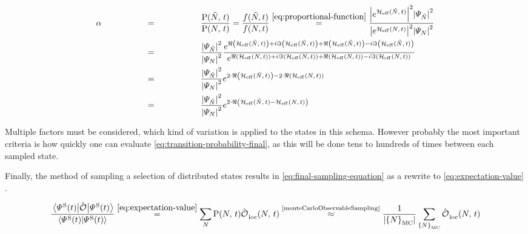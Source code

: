 \begin{equation}
    \label{eq:transition-probability-final}
    \begin{split}
        \alpha &\stackrel{\phantom{\ref{eq:proportional-function}}}{=} \frac{\probabilityOf{\tilde{N}}{t}}{\probabilityOf{N}{t}} =  \frac{f(\tilde{N},t)}{f(N,t)}
        \stackrel{\ref{eq:proportional-function}}{=}
        \frac{
            \absSquare{e^{\HeffOft[\tilde{N}]}} \absSquare{\psiN[\tilde{N}]}
        }{
            \absSquare{e^{\HeffOft}} \absSquare{\psiN}
        }\\
        &\stackrel{\phantom{\ref{eq:proportional-function}}}{=}
        \frac{\absSquare{\psiN[\tilde{N}]}}{\absSquare{\psiN}}
        \frac{
            e^{\real\left(\HeffOft[\tilde{N}]\right) + i\imaginary\left(\HeffOft[\tilde{N}]\right) +\real\left(\HeffOft[\tilde{N}]\right)-i \imaginary\left(\HeffOft[\tilde{N}]\right)}
        }{
            e^{\real\left(\HeffOft\right) + i\imaginary\left(\HeffOft\right) +\real\left(\HeffOft\right)-i \imaginary\left(\HeffOft\right)}
        }\\
        &\stackrel{\phantom{\ref{eq:proportional-function}}}{=}
        \frac{\absSquare{\psiN[\tilde{N}]}}{\absSquare{\psiN}}
        e^{2\cdot \real\left(\HeffOft[\tilde{N}]\right) - 2\cdot \real\left(\HeffOft\right)}\\
        &\stackrel{\phantom{\ref{eq:proportional-function}}}{=}
        \frac{\absSquare{\psiN[\tilde{N}]}}{\absSquare{\psiN}}
        e^{2\cdot \real\left(\HeffOft[\tilde{N}] - \HeffOft\right)}
    \end{split}
\end{equation}

Multiple factors must be considered, which kind of variation is applied to the states in this schema. 
However probably the most important criteria is how quickly one can evaluate \autoref{eq:transition-probability-final}, as this will be done tens to hundreds of times between each sampled state.

Finally, the method of sampling a selection of distributed states results in \autoref{eq:final-sampling-equation} as a rewrite to \autoref{eq:expectation-value} \cite{monteCarloObservableSampling}.

\begin{equation}
    \label{eq:final-sampling-equation}
    \frac{\bracketHelper{\psiOfT[\schroedingerPicture]}{\ObservableOp}{\psiOfT[\schroedingerPicture]}}{\braketHelper{\psiOfT[\schroedingerPicture]}{\psiOfT[\schroedingerPicture]}} \stackrel{\ref{eq:expectation-value}}{=} 
    \lsum[N]
    \probabilityOf{N}{t}
    \localObservable{N}{t} 
    \stackrel{\text{\cite{monteCarloObservableSampling}}}{\approx} \frac{1}{\left|\left\{N\right\}_\text{MC}\right|} \lsum[\left\{N\right\}_\text{MC}]\localObservable{N}{t}
\end{equation}